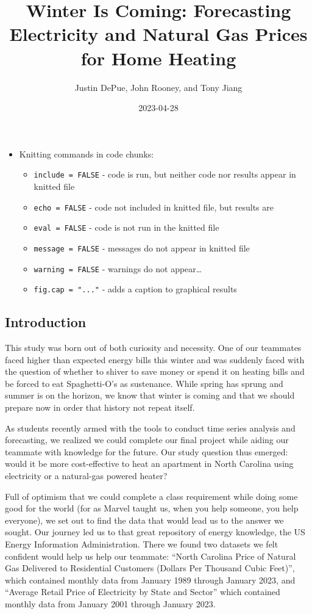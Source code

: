\documentclass[
]{article}
\title{Winter Is Coming: Forecasting Electricity and Natural Gas Prices
for Home Heating}
\author{Justin DePue, John Rooney, and Tony Jiang}
\date{2023-04-28}
\providecommand{\tightlist}{%
  \setlength{\itemsep}{0pt}\setlength{\parskip}{0pt}}
\begin{document}
\maketitle

{
\setcounter{tocdepth}{3}
\tableofcontents
}
\begin{itemize}
\tightlist
\item
  Knitting commands in code chunks:

  \begin{itemize}
  \tightlist
  \item
    \texttt{include\ =\ FALSE} - code is run, but neither code nor
    results appear in knitted file
  \item
    \texttt{echo\ =\ FALSE} - code not included in knitted file, but
    results are
  \item
    \texttt{eval\ =\ FALSE} - code is not run in the knitted file
  \item
    \texttt{message\ =\ FALSE} - messages do not appear in knitted file
  \item
    \texttt{warning\ =\ FALSE} - warnings do not appear\ldots{}
  \item
    \texttt{fig.cap\ =\ "..."} - adds a caption to graphical results
  \end{itemize}
\end{itemize}

\hypertarget{introduction}{%
\subsection{Introduction}\label{introduction}}

This study was born out of both curiosity and necessity. One of our
teammates faced higher than expected energy bills this winter and was
suddenly faced with the question of whether to shiver to save money or
spend it on heating bills and be forced to eat Spaghetti-O's as
sustenance. While spring has sprung and summer is on the horizon, we
know that winter is coming and that we should prepare now in order that
history not repeat itself.

As students recently armed with the tools to conduct time series
analysis and forecasting, we realized we could complete our final
project while aiding our teammate with knowledge for the future. Our
study question thus emerged: would it be more cost-effective to heat an
apartment in North Carolina using electricity or a natural-gas powered
heater?

Full of optimism that we could complete a class requirement while doing
some good for the world (for as Marvel taught us, when you help someone,
you help everyone), we set out to find the data that would lead us to
the answer we sought. Our journey led us to that great repository of
energy knowledge, the US Energy Information Administration. There we
found two datasets we felt confident would help us help our teammate:
``North Carolina Price of Natural Gas Delivered to Residential Customers
(Dollars Per Thousand Cubic Feet)'', which contained monthly data from
January 1989 through January 2023, and ``Average Retail Price of
Electricity by State and Sector'' which contained monthly data from
January 2001 through January 2023.
\end{document}
